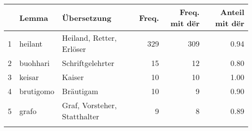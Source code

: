 \begin{tabular}{rllrrr}
  \lsptoprule
 & Lemma & Übersetzung & Freq. & Freq. mit dër & Anteil mit dër \\ 
  \midrule
1 & heilant & Heiland, Retter, Erlöser & 329 & 309 & 0.94 \\ 
  2 & buohhari & Schriftgelehrter &  15 &  12 & 0.80 \\ 
  3 & keisar & Kaiser &  10 &  10 & 1.00 \\ 
  4 & brutigomo & Bräutigam &  10 &   9 & 0.90 \\ 
  5 & grafo & Graf, Vorsteher, Statthalter &   9 &   8 & 0.89 \\ 
   \lspbottomrule
\end{tabular}
